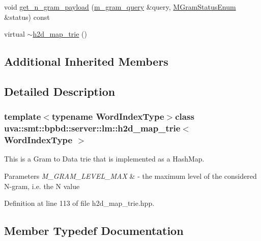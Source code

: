 \begin{DoxyCompactItemize}
\item 
void \hyperlink{classuva_1_1smt_1_1bpbd_1_1server_1_1lm_1_1h2d__map__trie_ae094b0de0d0256a1efee5ae947aff3df}{get\+\_\+n\+\_\+gram\+\_\+payload} (\hyperlink{classuva_1_1smt_1_1bpbd_1_1server_1_1lm_1_1m__gram__query}{m\+\_\+gram\+\_\+query} \&query, \hyperlink{namespaceuva_1_1smt_1_1bpbd_1_1server_1_1lm_ab9b3e7382b561dcb8abcd6b55e9b796a}{M\+Gram\+Status\+Enum} \&status) const 
\item 
virtual \hyperlink{classuva_1_1smt_1_1bpbd_1_1server_1_1lm_1_1h2d__map__trie_a52a65feebbaf4d09c7a7ffe6bbf6cdaa}{$\sim$h2d\+\_\+map\+\_\+trie} ()
\end{DoxyCompactItemize}
\subsection*{Additional Inherited Members}


\subsection{Detailed Description}
\subsubsection*{template$<$typename Word\+Index\+Type$>$class uva\+::smt\+::bpbd\+::server\+::lm\+::h2d\+\_\+map\+\_\+trie$<$ Word\+Index\+Type $>$}

This is a Gram to Data trie that is implemented as a Hash\+Map. 
\begin{DoxyParams}{Parameters}
{\em M\+\_\+\+G\+R\+A\+M\+\_\+\+L\+E\+V\+E\+L\+\_\+\+M\+A\+X} & -\/ the maximum level of the considered N-\/gram, i.\+e. the N value \\
\hline
\end{DoxyParams}


Definition at line 113 of file h2d\+\_\+map\+\_\+trie.\+hpp.



\subsection{Member Typedef Documentation}
\hypertarget{classuva_1_1smt_1_1bpbd_1_1server_1_1lm_1_1h2d__map__trie_a2259d6bc61a4d48aa9b535ba70d43818}{}
